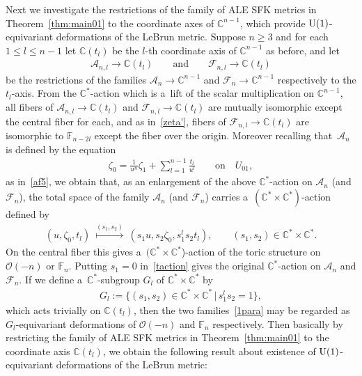 \documentclass[pdftex]{sigma}
\numberwithin{equation}{section}
\begin{document}
Next we investigate the restrictions of the family of ALE SFK metrics in Theorem~\ref{thm:main01} to the coordinate axes
of $\mathbb{C}^{n-1}$, which provide ${\rm{U}}(1)$-equivariant deformations of the LeBrun metric.
Suppose $n\ge 3$ and for each $1\le l\le n-1$ let $\mathbb{C}(t_l)$ be the $l$-th coordinate axis of $\mathbb{C}^{n-1}$
as before, and let
\begin{gather}\label{1para}
\mathscr A_{n,l}\to \mathbb{C}(t_l)
\qquad
\text{and}
\qquad
\mathscr F_{n,l}\to \mathbb{C}(t_l)
\end{gather}
be the restrictions of the families $\mathscr A_n\to\mathbb{C}^{n-1}$ and $\mathscr F_n\to\mathbb{C}^{n-1}$ respectively
to the $t_l$-axis.
From the $\mathbb{C}^*$-action which is a~lift of the scalar multiplication on $\mathbb{C}^{n-1}$, all f\/ibers of
$\mathscr A_{n,l}\to \mathbb{C}(t_l)$ and $\mathscr F_{n,l}\to \mathbb{C}(t_l)$ are mutually isomorphic except the
central f\/iber for each, and as in~\eqref{zeta'}, f\/ibers of $\mathscr F_{n,l}\to \mathbb{C}(t_l)$ are isomorphic to
$\mathbb{F}_{n-2l}$ except the f\/iber over the origin.
Moreover recalling that~$\mathscr A_n$ is def\/ined by the equation
\begin{gather*}%
\zeta_0 = \frac 1{u^n} \zeta_1 + \sum\limits_{l=1}^{n-1} \frac {t_l} {u^l}
\qquad
\text{on}
\quad
U_{01},
\end{gather*}
as in~\eqref{af5}, we obtain that, as an enlargement of the above $\mathbb{C}^*$-action on $\mathscr A_n$ (and $\mathscr
F_n$), the total space of the family $\mathscr A_n$ (and $\mathscr F_n$) carries
a~$(\mathbb{C}^*\times\mathbb{C}^*)$-action def\/ined by
\begin{gather}
\label{taction}
(u,\zeta_0,t_l)
\;\stackrel{(s_1,s_2)}{\longmapsto}
\;
(s_1u,s_2\zeta_0,s_1^ls_2t_l),
\qquad
(s_1,s_2)\in\mathbb{C}^*\times\mathbb{C}^*.
\end{gather}
On the central f\/iber this gives a~$(\mathbb{C}^*\times\mathbb{C}^*$)-action of the toric structure on $\mathscr O(-n)$
or $\mathbb{F}_n$.
Putting $s_1=0$ in~\eqref{taction} gives the original $\mathbb{C}^*$-action on $\mathscr A_n$ and $\mathscr F_n$.
If we def\/ine a~$\mathbb{C}^*$-subgroup $G_l$ of $\mathbb{C}^*\times\mathbb{C}^*$ by
\begin{gather}
\label{G_l}
G_l:=\big\{(s_1,s_2)\in\mathbb{C}^*\times\mathbb{C}^*\,|\, s_1^ls_2=1\big\},
\end{gather}
which acts trivially on $\mathbb{C}(t_l)$, then the two families~\eqref{1para} may be regarded as $G_l$-equivariant
deformations of $\mathscr O(-n)$ and $\mathbb{F}_n$ respectively.
Then basically by restricting the family of ALE SFK metrics in Theorem~\ref{thm:main01} to the coordinate axis
$\mathbb{C}(t_l)$, we obtain the following result about existence of ${\rm{U}}(1)$-equivariant deformations of the
LeBrun metric:
\end{document}
